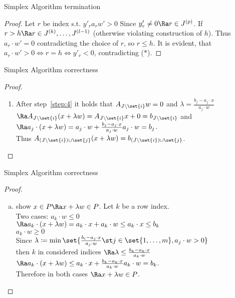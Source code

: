 \documentclass[a4paper, x11names, svgnames]{beamer}
\theoremstyle{definition}
\theoremstyle{plain}
\theoremstyle{plain}
\begin{document}
\begin{frame}{Simplex Algorithm termination}
    \begin{proof}
        Let $r$ be index s.t. $y'_r a_r w' > 0$
        Since $y'_r \neq 0 \Ra r\in J^{(p)}$. If $r > h \Ra r\in J^{(k)}, \dots, J^{(l-1)}$ (otherwise violating construction of $h$).
        Thus $a_r \cdot w' = 0$ contradicting the choice of $r$, so $r \leq h$.
        It is evident, that $a_r \cdot w' >0 \iff r=h \iff y'_r < 0$, contradicting ($*$).
    \end{proof}
\end{frame}


\begin{frame}{Simplex Algorithm correctness}
    \begin{proof}
    \renewcommand{\theenumi}{(\alph{enumi})}
    \begin{enumerate}
        \item After step~\ref{step:4} it holds that $A_{J\setminus\set{i}}w=0$ and $\lambda = \frac{b_j-a_j\cdot x}{a_j\cdot w}$
            $\Ra A_{J\setminus\set{i}}(x+\lambda w) = A_{J\setminus\set{i}}x + 0 = b_{J\setminus\set{i}}$
            and $\Ra a_j\cdot (x+\lambda w) = a_j \cdot w + \frac{b_j - a_j\cdot x}{a_j\cdot w} a_j\cdot w = b_j$. \\
            Thus $A_{(J\setminus\set{i})\cup\set{j}}(x+\lambda w) = b_{(J\setminus\set{i})\cup\set{j}}$.
    \end{enumerate}
    \end{proof}
\end{frame}

\begin{frame}{Simplex Algorithm correctness}
    \begin{proof}
        \renewcommand{\theenumi}{(\alph{enumi})}
        \begin{enumerate}[(b)]
        \item show $x \in P \Ra x + \lambda w \in P$. Let $k$ be a row index.\\
            Two cases: %
            $a_k\cdot w \leq 0$\\
            $\Ra a_k\cdot (x+\lambda w) = a_k\cdot x + a_k\cdot w \leq a_k\cdot x \leq b_k$ \\
            $a_k \cdot w \geq 0$ \\
            Since $\lambda \coloneqq \min  \set{\frac{b_i - a_j\cdot x}{a_j\cdot w} \st j\in\set{1,\dots, m}, a_j\cdot w > 0}$ \\
            then $k$ in considered indices $\Ra \lambda \leq \frac{b_k - a_k\cdot x}{a_k\cdot w} $
            $\Ra a_k\cdot (x + \lambda w) \leq a_k\cdot x + \frac{b_k-a_k\cdot x}{a_k\cdot w} a_k\cdot w  = b_k$. \\
            Therefore in both cases $\Ra x+\lambda w \in P$.
        \end{enumerate}
    \end{proof}
\end{frame}
\end{document}
